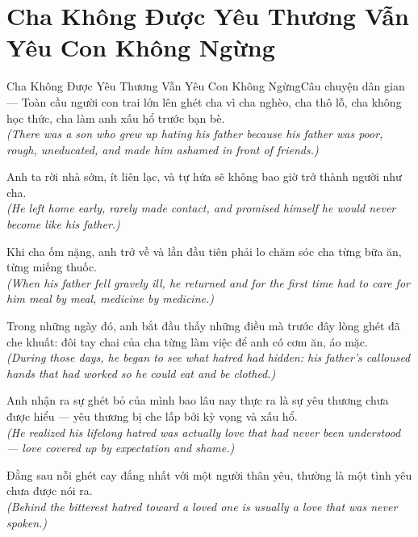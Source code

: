 \section{Cha Không Được Yêu Thương Vẫn Yêu Con Không Ngừng}
\begin{truyen}{Cha Không Được Yêu Thương Vẫn Yêu Con Không Ngừng}{Câu chuyện dân gian --- Toàn cầu}
 người con trai lớn lên ghét cha vì cha nghèo, cha thô lỗ, cha không học thức, cha làm anh xấu hổ trước bạn bè.\\[4pt]
\textit{(There was a son who grew up hating his father because his father was poor, rough, uneducated, and made him ashamed in front of friends.)}

Anh ta rời nhà sớm, ít liên lạc, và tự hứa sẽ không bao giờ trở thành người như cha.\\[4pt]
\textit{(He left home early, rarely made contact, and promised himself he would never become like his father.)}

Khi cha ốm nặng, anh trở về và lần đầu tiên phải lo chăm sóc cha từng bữa ăn, từng miếng thuốc.\\[4pt]
\textit{(When his father fell gravely ill, he returned and for the first time had to care for him meal by meal, medicine by medicine.)}

Trong những ngày đó, anh bắt đầu thấy những điều mà trước đây lòng ghét đã che khuất: đôi tay chai của cha từng làm việc để anh có cơm ăn, áo mặc.\\[4pt]
\textit{(During those days, he began to see what hatred had hidden: his father's calloused hands that had worked so he could eat and be clothed.)}

Anh nhận ra sự ghét bỏ của mình bao lâu nay thực ra là sự yêu thương chưa được hiểu --- yêu thương bị che lấp bởi kỳ vọng và xấu hổ.\\[4pt]
\textit{(He realized his lifelong hatred was actually love that had never been understood --- love covered up by expectation and shame.)}

\end{truyen}
\begin{baihoc}
  Đằng sau nỗi ghét cay đắng nhất với một người thân yêu, thường là một tình yêu chưa được nói ra.\\[4pt]
  \textit{(Behind the bitterest hatred toward a loved one is usually a love that was never spoken.)}
\end{baihoc}

